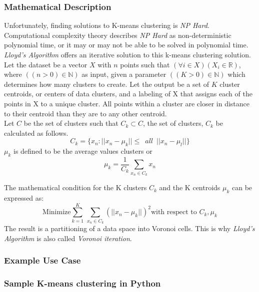 \documentclass[12pt]{article}
\begin{document}
\subsubsection{Mathematical Description}
Unfortunately, finding solutions to K-means clustering is \textit{NP Hard}. Computational complexity theory describes \textit{NP Hard}  as non-deterministic polynomial time, or it may or may not be able to be solved in polynomial time. \textit{Lloyd's Algorithm} offers an iterative solution to this k-means clustering solution. Let the dataset be a vector $X$ with $n$ points such that $(\forall i \in X)(X_i \in \mathbb{R})$, where $((n>0) \in \mathbb{N})$ as input, given a parameter $((K >0) \in \mathbb{N})$ which determines how many clusters to create. Let the output be a set of $K$ cluster centroids, or centers of data clusters, and a labeling of X that assigns each of the points in X to a unique cluster. All points within a cluster are closer in distance to their centroid than they are to any other centroid. \\
Let $C$ be the set of clusters such that $C_k \subset C$, the set of clusters, $C_k$ be calculated as follows. \\
\begin{equation}
	C_k = \{ x_n : \vert \vert x_n - \mu_k \vert \vert \leq \,\,\, all \,\,\, \vert \vert x_n - \mu_l \vert \vert \}
\end{equation}
$\mu_k$ is defined to be the average values clusters or 
\begin{equation}
\mu_k = \frac{1}{C_k} \sum_{x_n \in C_k} x_n	
\end{equation}

The mathematical condition for the K clusters $C_k$ and the K centroids $\mu_k$ can be expressed as:\\
\begin{equation}
	\text{Minimize} \sum_{k=1}^{K}\,\sum_{x_n \in C_k} (\vert \vert x_n - \mu_k \vert \vert )^2 \text{with respect to}\,\, C_k, \mu_k
\end{equation} \cite{dsl}
The result is a partitioning of a data space into Voronoi cells. This is why \textit{Lloyd's Algorithm} is also called \textit{Voronoi iteration}.
\subsubsection{Example Use Case}
\subsubsection{Sample K-means clustering in Python}
\end{document}
